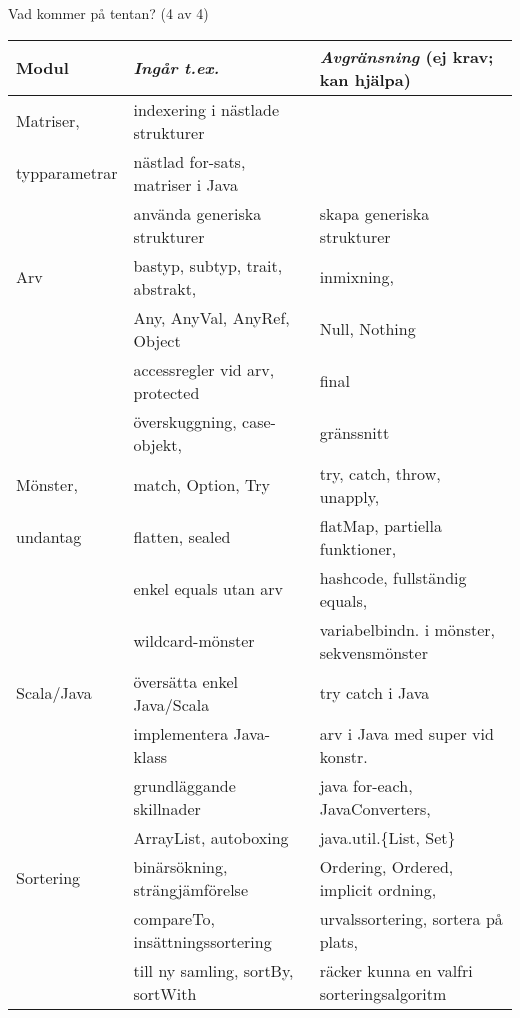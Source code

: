 \begin{Slide}{Vad kommer på tentan? (4 av 4)}\SlideFontTiny
\hspace{-2em}\begin{minipage}{1.0\textwidth}
\begin{tabular}{l | l | l}
\textbf{Modul} & \textit{Ingår t.ex.}& \textit{Avgränsning} (ej krav; kan hjälpa)\\\hline

Matriser,     & indexering i nästlade strukturer & \\
typparametrar & nästlad for-sats, matriser i Java  & \\
              & använda generiska strukturer & skapa generiska strukturer\\
\hline

Arv         &  bastyp, subtyp, trait, abstrakt,   & inmixning, \\
            &  Any, AnyVal, AnyRef, Object     & Null, Nothing\\
            &  accessregler vid arv, protected & final\\
            &  överskuggning, case-objekt,     & gränssnitt\\
\hline

Mönster,     & match, Option, Try       & try, catch, throw, unapply,\\
undantag     & flatten, sealed          & flatMap, partiella funktioner,\\
             & enkel equals utan arv    & hashcode, fullständig equals,   \\
             & wildcard-mönster         & variabelbindn. i mönster, sekvensmönster\\
\hline


Scala/Java & översätta enkel Java/Scala & try catch i Java \\
           & implementera Java-klass  &  arv i Java med super vid konstr.\\
           & grundläggande skillnader & java for-each, JavaConverters,\\
           & ArrayList, autoboxing & java.util.\{List, Set\}\\
\hline

Sortering & binärsökning, strängjämförelse & Ordering, Ordered, implicit ordning, \\
             & compareTo, insättningssortering & urvalssortering, sortera på plats,\\
             & till ny samling, sortBy, sortWith & räcker kunna en valfri sorteringsalgoritm \\
\hline

\end{tabular}
\end{minipage}
\end{Slide}



